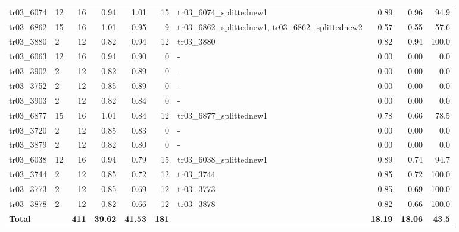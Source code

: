 \begin{table}[H]
{\begin{tabular}{llrrrr>{\raggedright\arraybackslash}p{3.2cm}rrr}
tr03\_6074 & 12 & 16 & 0.94 & 1.01 & 15 & tr03\_6074\_splittednew1 & 0.89 & 0.96 & 94.9 \\
tr03\_6862 & 15 & 16 & 1.01 & 0.95 & 9 & tr03\_6862\_splittednew1, tr03\_6862\_splittednew2 & 0.57 & 0.55 & 57.6 \\
tr03\_3880 & 2 & 12 & 0.82 & 0.94 & 12 & tr03\_3880 & 0.82 & 0.94 & 100.0 \\
tr03\_6063 & 12 & 16 & 0.94 & 0.90 & 0 & - & 0.00 & 0.00 & 0.0 \\
tr03\_3902 & 2 & 12 & 0.82 & 0.89 & 0 & - & 0.00 & 0.00 & 0.0 \\
tr03\_3752 & 2 & 12 & 0.85 & 0.89 & 0 & - & 0.00 & 0.00 & 0.0 \\
tr03\_3903 & 2 & 12 & 0.82 & 0.84 & 0 & - & 0.00 & 0.00 & 0.0 \\
tr03\_6877 & 15 & 16 & 1.01 & 0.84 & 12 & tr03\_6877\_splittednew1 & 0.78 & 0.66 & 78.5 \\
tr03\_3720 & 2 & 12 & 0.85 & 0.83 & 0 & - & 0.00 & 0.00 & 0.0 \\
tr03\_3879 & 2 & 12 & 0.82 & 0.80 & 0 & - & 0.00 & 0.00 & 0.0 \\
tr03\_6038 & 12 & 16 & 0.94 & 0.79 & 15 & tr03\_6038\_splittednew1 & 0.89 & 0.74 & 94.7 \\
tr03\_3744 & 2 & 12 & 0.85 & 0.72 & 12 & tr03\_3744 & 0.85 & 0.72 & 100.0 \\
tr03\_3773 & 2 & 12 & 0.85 & 0.69 & 12 & tr03\_3773 & 0.85 & 0.69 & 100.0 \\
tr03\_3878 & 2 & 12 & 0.82 & 0.66 & 12 & tr03\_3878 & 0.82 & 0.66 & 100.0 \\
\midrule
\textbf{Total} &  & \textbf{411} & \textbf{39.62} & \textbf{41.53} & \textbf{181} &  & \textbf{18.19} & \textbf{18.06} & \textbf{43.5} \\
\bottomrule
\end{tabular}%
}
\end{table}